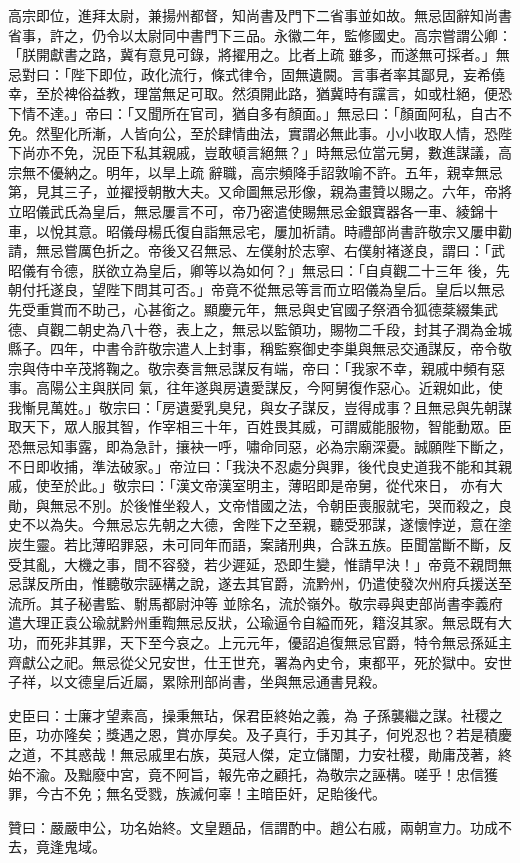 \begin{pinyinscope}
 高宗即位，進拜太尉，兼揚州都督，知尚書及門下二省事並如故。無忌固辭知尚書省事，許之，仍令以太尉同中書門下三品。永徽二年，監修國史。高宗嘗謂公卿：「朕開獻書之路，冀有意見可錄，將擢用之。比者上疏
 雖多，而遂無可採者。」無忌對曰：「陛下即位，政化流行，條式律令，固無遺闕。言事者率其鄙見，妄希僥幸，至於裨俗益教，理當無足可取。然須開此路，猶冀時有讜言，如或杜絕，便恐下情不達。」帝曰：「又聞所在官司，猶自多有顏面。」無忌曰：「顏面阿私，自古不免。然聖化所漸，人皆向公，至於肆情曲法，實謂必無此事。小小收取人情，恐陛下尚亦不免，況臣下私其親戚，豈敢頓言絕無？」時無忌位當元舅，數進謀議，高宗無不優納之。明年，以旱上疏
 辭職，高宗頻降手詔敦喻不許。五年，親幸無忌第，見其三子，並擢授朝散大夫。又命圖無忌形像，親為畫贊以賜之。六年，帝將立昭儀武氏為皇后，無忌屢言不可，帝乃密遣使賜無忌金銀寶器各一車、綾錦十車，以悅其意。昭儀母楊氏復自詣無忌宅，屢加祈請。時禮部尚書許敬宗又屢申勸請，無忌嘗厲色折之。帝後又召無忌、左僕射於志寧、右僕射褚遂良，謂曰：「武昭儀有令德，朕欲立為皇后，卿等以為如何？」無忌曰：「自貞觀二十三年
 後，先朝付托遂良，望陛下問其可否。」帝竟不從無忌等言而立昭儀為皇后。皇后以無忌先受重賞而不助己，心甚銜之。顯慶元年，無忌與史官國子祭酒令狐德棻綴集武德、貞觀二朝史為八十卷，表上之，無忌以監領功，賜物二千段，封其子潤為金城縣子。四年，中書令許敬宗遣人上封事，稱監察御史李巢與無忌交通謀反，帝令敬宗與侍中辛茂將鞠之。敬宗奏言無忌謀反有端，帝曰：「我家不幸，親戚中頻有惡事。高陽公主與朕同
 氣，往年遂與房遺愛謀反，今阿舅復作惡心。近親如此，使我慚見萬姓。」敬宗曰：「房遺愛乳臭兒，與女子謀反，豈得成事？且無忌與先朝謀取天下，眾人服其智，作宰相三十年，百姓畏其威，可謂威能服物，智能動眾。臣恐無忌知事露，即為急計，攘袂一呼，嘯命同惡，必為宗廟深憂。誠願陛下斷之，不日即收捕，準法破家。」帝泣曰：「我決不忍處分與罪，後代良史道我不能和其親戚，使至於此。」敬宗曰：「漢文帝漢室明主，薄昭即是帝舅，從代來日，
 亦有大勛，與無忌不別。於後惟坐殺人，文帝惜國之法，令朝臣喪服就宅，哭而殺之，良史不以為失。今無忌忘先朝之大德，舍陛下之至親，聽受邪謀，遂懷悖逆，意在塗炭生靈。若比薄昭罪惡，未可同年而語，案諸刑典，合誅五族。臣聞當斷不斷，反受其亂，大機之事，間不容發，若少遲延，恐即生變，惟請早決！」帝竟不親問無忌謀反所由，惟聽敬宗誣構之說，遂去其官爵，流黔州，仍遣使發次州府兵援送至流所。其子秘書監、駙馬都尉沖等
 並除名，流於嶺外。敬宗尋與吏部尚書李義府遣大理正袁公瑜就黔州重鞫無忌反狀，公瑜逼令自縊而死，籍沒其家。無忌既有大功，而死非其罪，天下至今哀之。上元元年，優詔追復無忌官爵，特令無忌孫延主齊獻公之祀。無忌從父兄安世，仕王世充，署為內史令，東都平，死於獄中。安世子祥，以文德皇后近屬，累除刑部尚書，坐與無忌通書見殺。



 史臣曰：士廉才望素高，操秉無玷，保君臣終始之義，為
 子孫襲繼之謀。社稷之臣，功亦隆矣；獎遇之恩，賞亦厚矣。及子真行，手刃其子，何兇忍也？若是積慶之道，不其惑哉！無忌戚里右族，英冠人傑，定立儲闈，力安社稷，勛庸茂著，終始不渝。及黜廢中宮，竟不阿旨，報先帝之顧托，為敬宗之誣構。嗟乎！忠信獲罪，今古不免；無名受戮，族滅何辜！主暗臣奸，足貽後代。



 贊曰：嚴嚴申公，功名始終。文皇題品，信謂酌中。趙公右戚，兩朝宣力。功成不去，竟逢鬼域。



\end{pinyinscope}
